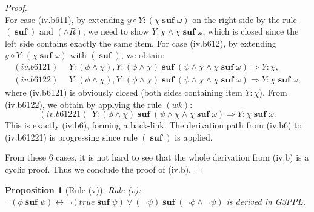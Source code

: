 \documentclass[manuscript,screen]{acmart}
\newtheorem{prop}{Proposition}[section]
\newcommand{\true}[0]{\mathit{true}}
\newcommand{\cat}[0]{\diamond}
\newcommand{\GiiiPPLcyc}[0]{\mbox{G3PPL}}
\DeclareMathOperator{\osuf}{\mathbf{suf}}
\begin{document}
\begin{proof}
$$$$
For case (iv.b611), by extending $y\cat Y : (\chi\osuf\omega)$ on the right side by the rule $(\osuf)$ and $(\wedge R)$, we need to show $Y : \chi\wedge\chi\osuf\omega$, which is closed since the left side contains exactly the same item. 
For case (iv.b612), by extending $y\cat Y : (\chi\osuf\omega)$ with $(\osuf)$, we obtain:
$$
\begin{aligned}
(iv.b6121)\ \ & Y : (\phi\wedge\chi), Y : (\phi\wedge\chi)\osuf (\psi\wedge \chi\wedge \chi\osuf\omega) \Rightarrow Y : \chi,\\
(iv.b6122)\ \ & Y : (\phi\wedge\chi), Y : (\phi\wedge\chi)\osuf (\psi\wedge \chi\wedge \chi\osuf\omega) \Rightarrow Y : \chi\osuf \omega, 
\end{aligned}
$$
where (iv.b6121) is obviously closed (both sides containing item $Y : \chi$).
From (iv.b6122), we obtain by applying the rule $(wk)$:
$$
(iv.b61221)\ \ Y : (\phi\wedge\chi)\osuf (\psi\wedge \chi\wedge \chi\osuf\omega) \Rightarrow Y : \chi\osuf \omega. 
$$
This is exactly (iv.b6), forming a back-link.
The derivation path from (iv.b6) to (iv.b61221) is progressing since rule $(\osuf)$ is applied.

From these 6 cases, 
it is not hard to see that the whole derivation from (iv.b) is a cyclic proof. 
Thus we conclude the proof of (iv.b). 
\fi

\end{proof}

\begin{prop}[Rule (v)]
Rule (v): 
$\neg(\phi\osuf \psi) \leftrightarrow \neg(\true \osuf \psi)\vee (\neg \psi)\osuf (\neg\phi\wedge \neg\psi)$
is derived in \GiiiPPLcyc. 
\end{prop}
\end{document}
